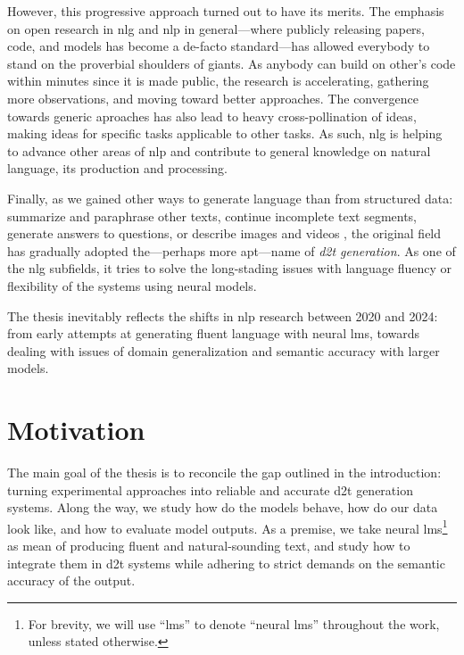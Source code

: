 However, this progressive approach turned out to have its merits. The emphasis on open research in \ac{nlg} and \ac{nlp} in general---where publicly releasing papers, code, and models has become a de-facto standard---has allowed everybody to stand on the proverbial shoulders of giants. As anybody can build on other's code within minutes since it is made public, the research is accelerating, gathering more observations, and moving toward better approaches. The convergence towards generic aproaches has also lead to heavy cross-pollination of ideas, making ideas for specific tasks applicable to other tasks. As such, \ac{nlg} is helping to advance other areas of \ac{nlp} and contribute to general knowledge on natural language, its production and processing.

Finally, as we gained other ways to generate language than from structured data: summarize and paraphrase other texts, continue incomplete text segments, generate answers to questions, or describe images and videos \cite{Dong2021ASO}, the original field has gradually adopted the---perhaps more apt---name of \textit{\ac{d2t} generation}. As one of the \ac{nlg} subfields, it tries to solve the long-stading issues with language fluency or flexibility of the systems using neural models.

The thesis inevitably reflects the shifts in \ac{nlp} research between 2020 and 2024: from early attempts at generating fluent language with neural \acp{lm}, towards dealing with issues of domain generalization and semantic accuracy with larger models.







\section{Motivation}
\label{sec:rq}

The main goal of the thesis is to reconcile the gap outlined in the introduction: turning experimental approaches into reliable and accurate \ac{d2t} generation systems. Along the way, we study how do the models behave, how do our data look like, and how to evaluate model outputs. As a premise, we take neural \acp{lm}\footnote{For brevity, we will use ``\acp{lm}'' to denote ``neural \acp{lm}'' throughout the work, unless stated otherwise.} as mean of producing fluent and natural-sounding text, and study how to integrate them in \ac{d2t} systems while adhering to strict demands on the semantic accuracy of the output.

